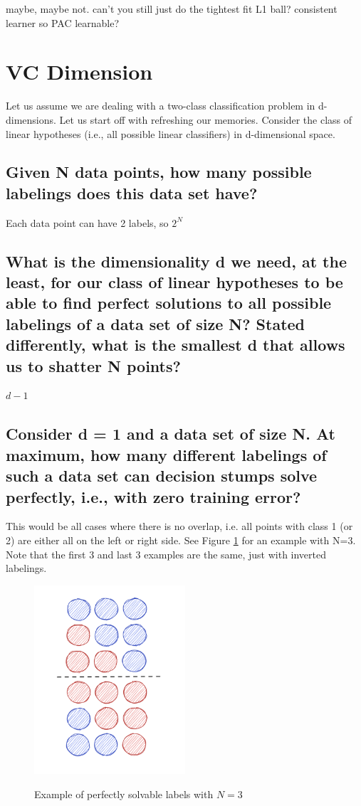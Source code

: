 \documentclass[11pt,a4paper]{article}
\begin{document}
maybe, maybe not. can't you still just do the tightest fit L1 ball?
consistent learner so PAC learnable?

\clearpage
\section{VC Dimension}
\label{sec:VC}
Let us assume we are dealing with a two-class classification problem in d-dimensions.
Let us start off with refreshing our memories. Consider the class of linear hypotheses (i.e.,
all possible linear classifiers) in d-dimensional space.

\subsection{Given N data points, how many possible labelings does this data set have?}
\label{sec:2a}
Each data point can have 2 labels, so $2^N$

\subsection{What is the dimensionality d we need, at the least, for our class of linear hypotheses to
be able to find perfect solutions to all possible labelings of a data set of size N? Stated
differently, what is the smallest d that allows us to shatter N points?}
\label{sec:2b}
$d - 1$ 


\subsection{Consider d = 1 and a data set of size N. At maximum, how many different labelings of
such a data set can decision stumps solve perfectly, i.e., with zero training error?}
\label{sec:2c}
This would be all cases where there is no overlap, i.e. all points with class 1 (or 2) are either all on the left or right side. See Figure \ref{fig:d1n3} for an example with N=3. Note that the first 3 and last 3 examples are the same, just with inverted labelings.

\begin{figure}[h]
    \caption{Example of perfectly solvable labels with $N=3$}
    \centering
    \includegraphics[width=0.5\textwidth]{d1n3_possibilities.png}
    \label{fig:d1n3}
\end{figure}
\end{document}
